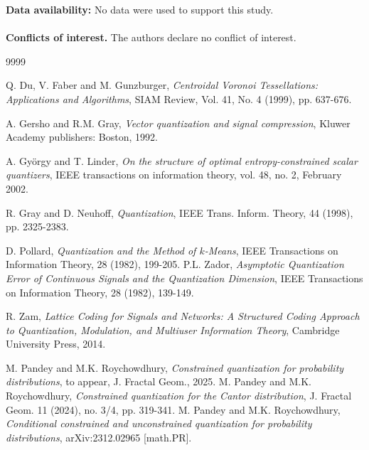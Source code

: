 \documentclass[12pt, reqno]{amsart}
\theoremstyle{plain}
\theoremstyle{definition}
\begin{document}
							\noindent
							\textbf{Data availability:} No data were used to support this study.\\
							\\
							\noindent
\textbf{Conflicts of interest.} The authors declare no conflict of interest.\\
					 
							
 
							
 







\begin{thebibliography}{9999}





 Q. Du, V. Faber and M. Gunzburger, \emph{Centroidal Voronoi Tessellations: Applications and Algorithms}, SIAM Review, Vol. 41, No. 4 (1999), pp. 637-676.

 A. Gersho and R.M. Gray, \emph{Vector quantization and signal compression}, Kluwer Academy publishers: Boston, 1992.



 A. Gy\"orgy and T. Linder, \emph{On the structure of optimal entropy-constrained scalar quantizers},  IEEE transactions on information theory, vol. 48, no. 2, February 2002.


      R. Gray and D. Neuhoff, \emph{Quantization}, IEEE Trans. Inform. Theory,  44 (1998), pp. 2325-2383.

  D. Pollard, \emph{Quantization and the Method of $k$-Means}, IEEE Transactions on Information Theory, 28 (1982), 199-205.
 P.L. Zador, \emph{Asymptotic Quantization Error of Continuous Signals and the Quantization Dimension}, IEEE Transactions on Information Theory, 28 (1982), 139-149.

 R. Zam, \emph{Lattice Coding for Signals and Networks: A Structured Coding Approach to Quantization, Modulation, and Multiuser Information Theory}, Cambridge University Press, 2014.


 M. Pandey and M.K. Roychowdhury, \emph{Constrained quantization for probability distributions}, to appear, J. Fractal Geom., 2025. 
 M. Pandey and M.K. Roychowdhury, \emph{Constrained quantization for the Cantor distribution}, J. Fractal Geom. 11 (2024), no. 3/4, pp. 319-341.
 M. Pandey and M.K. Roychowdhury, \emph{Conditional constrained and unconstrained quantization for probability distributions}, arXiv:2312.02965 [math.PR].



\end{thebibliography}
\end{document}
